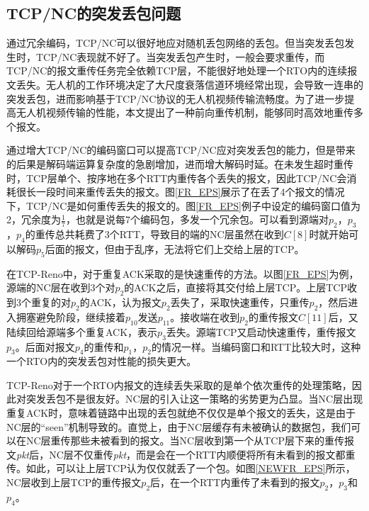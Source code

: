 \subsection{TCP/NC的突发丢包问题}
通过冗余编码，TCP/NC可以很好地应对随机丢包网络的丢包。但当突发丢包发生时，TCP/NC表现就不好了。当突发丢包产生时，一般会要求重传，而TCP/NC的报文重传任务完全依赖TCP层，不能很好地处理一个RTO内的连续报文丢失。无人机的工作环境决定了大尺度衰落信道环境经常出现，会导致一连串的突发丢包，进而影响基于TCP/NC协议的无人机视频传输流畅度。为了进一步提高无人机视频传输的性能，本文提出了一种前向重传机制，能够同时高效地重传多个报文。
\par
通过增大TCP/NC的编码窗口可以提高TCP/NC应对突发丢包的能力，但是带来的后果是解码端运算复杂度的急剧增加，进而增大解码时延。在未发生超时重传时，TCP层单个、按序地在多个RTT内重传各个丢失的报文，因此TCP/NC会消耗很长一段时间来重传丢失的报文。图\ref{FR_EPS}展示了在丢了4个报文的情况下，TCP/NC是如何重传丢失的报文的。图\ref{FR_EPS}例子中设定的编码窗口值为2，冗余度为$\frac{1}{7}$，也就是说每7个编码包，多发一个冗余包。可以看到源端对$p_2$，$p_3$，$p_4$的重传总共耗费了3个RTT，导致目的端的NC层虽然在收到$C\left[8\right]$时就开始可以解码$p_5$后面的报文，但由于乱序，无法将它们上交给上层的TCP。
\par
在TCP-Reno中，对于重复ACK采取的是快速重传的方法。以图\ref{FR_EPS}为例，源端的NC层在收到3个对$p_2$的ACK之后，直接将其交付给上层TCP。上层TCP收到3个重复的对$p_2$的ACK，认为报文$p_2$丢失了，采取快速重传，只重传$p_2$，然后进入拥塞避免阶段，继续接着$p_{10}$发送$p_{11}$。接收端在收到$p_2$的重传报文$C\left[11\right]$后，又陆续回给源端多个重复ACK，表示$p_3$丢失。源端TCP又启动快速重传，重传报文$p_3$。后面对报文$p_4$的重传和$p_1$，$p_2$的情况一样。当编码窗口和RTT比较大时，这种一个RTO内的突发丢包对性能的损失更大。
\par
TCP-Reno对于一个RTO内报文的连续丢失采取的是单个依次重传的处理策略，因此对突发丢包不是很友好。NC层的引入让这一策略的劣势更为凸显。当NC层出现重复ACK时，意味着链路中出现的丢包就绝不仅仅是单个报文的丢失，这是由于NC层的“seen”机制导致的。直觉上，由于NC层缓存有未被确认的数据包，我们可以在NC层重传那些未被看到的报文。当NC层收到第一个从TCP层下来的重传报文\emph{pkt}后，NC层不仅重传\emph{pkt}，而是会在一个RTT内顺便将所有未看到的报文都重传。如此，可以让上层TCP认为仅仅就丢了一个包。如图\ref{NEWFR_EPS}所示，NC层收到上层TCP的重传报文$p_2$后，在一个RTT内重传了未看到的报文$p_2$，$p_3$和$p_4$。
